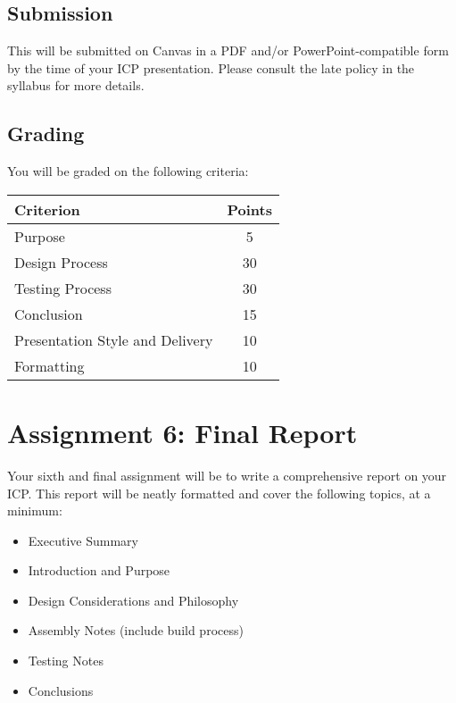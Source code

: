         \subsection*{Submission}
        This will be submitted on Canvas in a PDF and/or PowerPoint-compatible form by the time of your ICP presentation.
        Please consult the late policy in the syllabus for more details.
    
        \subsection*{Grading}
        You will be graded on the following criteria:
    
        \begin{table}[h!]
            \begin{tabular}{l | c}
                \toprule
                Criterion & Points \\
                \midrule
                Purpose & 5 \\
                Design Process & 30 \\
                Testing Process & 30 \\
                Conclusion & 15 \\
                Presentation Style and Delivery & 10 \\
                Formatting & 10 \\
                \bottomrule
            \end{tabular}
        \end{table}

\section*{Assignment 6: Final Report}
Your sixth and final assignment will be to write a comprehensive report on your ICP.
This report will be neatly formatted and cover the following topics, at a minimum:

\begin{itemize}
    \item Executive Summary
    \item Introduction and Purpose
    \item Design Considerations and Philosophy
    \item Assembly Notes (include build process)
    \item Testing Notes
    \item Conclusions
\end{itemize}

